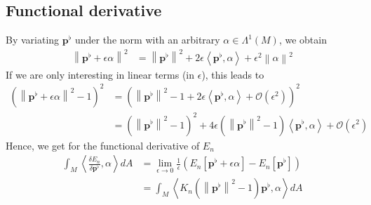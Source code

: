 \documentclass[a4paper,11pt]{scrartcl}
\newcommand{\M}{M}
\newcommand{\dA}{dA}
\newcommand{\pfl}{\mathbf{p}^{\flat}}
\newcommand{\EN}{E_{n}}
\renewcommand{\O}{\mathcal{O}}
\begin{document}
  \subsection{Functional derivative}

  By variating \( \pfl \) under the norm with an arbitrary \( \alpha\in\Lambda^{1}(\M) \), we obtain
  \begin{align}
    \left\| \pfl + \epsilon \alpha \right\|^{2} &= \left\| \pfl \right\|^{2} 
                                                  + 2\epsilon\left\langle \pfl, \alpha \right\rangle
                                                  + \epsilon^{2}\left\| \alpha \right\|^{2}
  \end{align}
  If we are only interesting in linear terms (in \( \epsilon \)), this leads to
  \begin{align}
    \left( \left\| \pfl + \epsilon \alpha \right\|^{2} - 1 \right)^{2}
            &= \left( \left\| \pfl \right\|^{2} - 1  + 2\epsilon\left\langle \pfl, \alpha \right\rangle 
                  + \O\left( \epsilon^{2} \right) \right)^{2}\\
            &= \left( \left\| \pfl \right\|^{2} - 1 \right)^{2} 
                + 4\epsilon\left(\left\| \pfl \right\|^{2} - 1 \right)\left\langle \pfl, \alpha \right\rangle
                + \O\left( \epsilon^{2} \right)
  \end{align}
  Hence, we get for the functional derivative of \( \EN \)
  \begin{align}
    \int_{\M} \left\langle\frac{\delta\EN}{\delta\pfl} , \alpha \right\rangle \dA
      &= \lim_{\epsilon\rightarrow 0} \frac{1}{\epsilon}\left( \EN\left[ \pfl + \epsilon\alpha \right] - \EN\left[ \pfl\right]\right) \\
      &= \int_{\M} \left\langle K_{n} \left( \left\| \pfl \right\|^{2} - 1 \right)\pfl , \alpha \right\rangle \dA
  \end{align}
\end{document}
